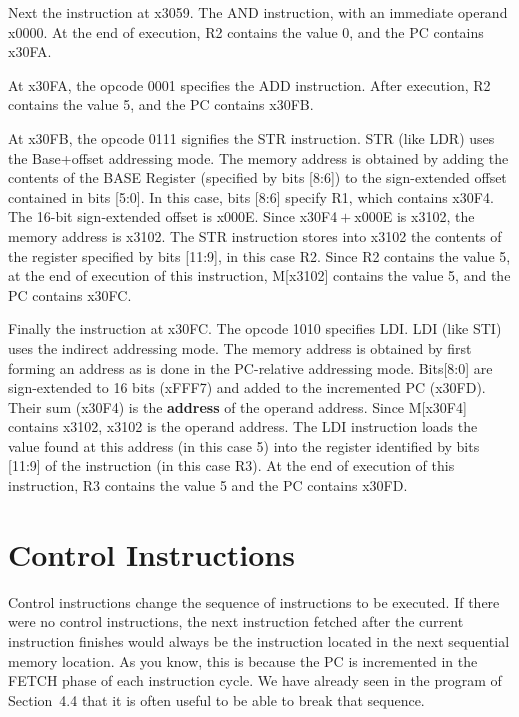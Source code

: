 \documentclass{patt}
\begin{document}
Next the instruction at x3059. The AND instruction, with an immediate operand
x0000.  At the end of execution, R2 contains the value 0, and the PC contains 
x30FA.

At x30FA, the opcode 0001 specifies the ADD instruction.
After execution, R2 contains the value 5, and the PC contains x30FB.

At x30FB, the opcode 0111 signifies the STR instruction.  STR (like LDR)
uses the Base+offset addressing mode. The memory address is obtained by 
adding the contents of the BASE Register (specified by bits [8:6]) to the
sign-extended offset contained in bits [5:0]. In this case, bits [8:6]
specify R1, which contains x30F4. The 16-bit sign-extended offset is x000E. 
Since x30F4${}+{}$x000E is x3102, the memory address is x3102.
The STR instruction stores into x3102 the contents of the register specified by
bits [11:9], in this case R2.  Since R2 contains the value 5, at the end of 
execution of this instruction, M[x3102] contains the value 5, and the PC 
contains x30FC.

Finally the instruction at x30FC.  The opcode 1010 specifies LDI. 
LDI (like STI) uses the indirect addressing mode. The memory address is 
obtained by first forming an address as is done in the PC-relative addressing 
mode.  Bits[8:0] are sign-extended to 16 bits (xFFF7) and added to the
incremented PC (x30FD).  Their sum (x30F4) is the {\bf address} of the 
operand address.  Since M[x30F4] contains x3102, x3102 is the operand address. 
The LDI instruction loads the value found at this address (in this case 5) 
into the register
identified by bits [11:9] of the instruction (in this case R3). At the end
of execution of this instruction, R3 contains the value 5 and the PC
contains x30FD.

\section{Control Instructions}

Control instructions change the sequence of instructions to be
executed. If there were no control instructions, the next instruction
fetched after the current instruction finishes would always be the instruction
located in the next sequential memory location. As you know, this is because
the PC is incremented in the FETCH phase of each instruction cycle.  We have 
already seen in the program of Section~4.4 that it is often useful to be able 
to break that sequence.
\end{document}
